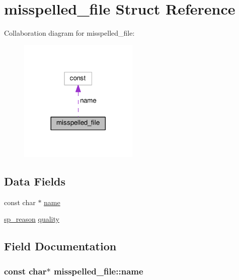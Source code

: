 \hypertarget{structmisspelled__file}{}\section{misspelled\+\_\+file Struct Reference}
\label{structmisspelled__file}


Collaboration diagram for misspelled\+\_\+file\+:
\nopagebreak
\begin{figure}[H]
\begin{center}
\leavevmode
\includegraphics[width=161pt]{structmisspelled__file__coll__graph}
\end{center}
\end{figure}
\subsection*{Data Fields}
\begin{DoxyCompactItemize}
\item 
const char $\ast$ \hyperlink{structmisspelled__file_aad0c24251642193fabc8d82df310e721}{name}
\item 
\hyperlink{mod__speling_8c_a1653aadcc6368d9231646bb0b50a8176}{sp\+\_\+reason} \hyperlink{structmisspelled__file_a3c913b520290ca13241ecd9eb04e5f73}{quality}
\end{DoxyCompactItemize}


\subsection{Field Documentation}
\subsubsection[{\texorpdfstring{name}{name}}]{\setlength{\rightskip}{0pt plus 5cm}const char$\ast$ misspelled\+\_\+file\+::name}\hypertarget{structmisspelled__file_aad0c24251642193fabc8d82df310e721}{}\label{structmisspelled__file_aad0c24251642193fabc8d82df310e721}
